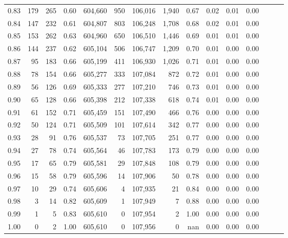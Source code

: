 \begin{tabular}{rrrrrrrrrrrrrrr}
0.83 &     179 &    265 &  0.60 &  604,660 &      950 &  106,016 &    1,940 &  0.67 &  0.02 &  0.01 &      0.00 \\
0.84 &     147 &    232 &  0.61 &  604,807 &      803 &  106,248 &    1,708 &  0.68 &  0.02 &  0.01 &      0.00 \\
0.85 &     153 &    262 &  0.63 &  604,960 &      650 &  106,510 &    1,446 &  0.69 &  0.01 &  0.01 &      0.00 \\
0.86 &     144 &    237 &  0.62 &  605,104 &      506 &  106,747 &    1,209 &  0.70 &  0.01 &  0.00 &      0.00 \\
0.87 &      95 &    183 &  0.66 &  605,199 &      411 &  106,930 &    1,026 &  0.71 &  0.01 &  0.00 &      0.00 \\
0.88 &      78 &    154 &  0.66 &  605,277 &      333 &  107,084 &      872 &  0.72 &  0.01 &  0.00 &      0.00 \\
0.89 &      56 &    126 &  0.69 &  605,333 &      277 &  107,210 &      746 &  0.73 &  0.01 &  0.00 &      0.00 \\
0.90 &      65 &    128 &  0.66 &  605,398 &      212 &  107,338 &      618 &  0.74 &  0.01 &  0.00 &      0.00 \\
0.91 &      61 &    152 &  0.71 &  605,459 &      151 &  107,490 &      466 &  0.76 &  0.00 &  0.00 &      0.00 \\
0.92 &      50 &    124 &  0.71 &  605,509 &      101 &  107,614 &      342 &  0.77 &  0.00 &  0.00 &      0.00 \\
0.93 &      28 &     91 &  0.76 &  605,537 &       73 &  107,705 &      251 &  0.77 &  0.00 &  0.00 &      0.00 \\
0.94 &      27 &     78 &  0.74 &  605,564 &       46 &  107,783 &      173 &  0.79 &  0.00 &  0.00 &      0.00 \\
0.95 &      17 &     65 &  0.79 &  605,581 &       29 &  107,848 &      108 &  0.79 &  0.00 &  0.00 &      0.00 \\
0.96 &      15 &     58 &  0.79 &  605,596 &       14 &  107,906 &       50 &  0.78 &  0.00 &  0.00 &      0.00 \\
0.97 &      10 &     29 &  0.74 &  605,606 &        4 &  107,935 &       21 &  0.84 &  0.00 &  0.00 &      0.00 \\
0.98 &       3 &     14 &  0.82 &  605,609 &        1 &  107,949 &        7 &  0.88 &  0.00 &  0.00 &      0.00 \\
0.99 &       1 &      5 &  0.83 &  605,610 &        0 &  107,954 &        2 &  1.00 &  0.00 &  0.00 &      0.00 \\
1.00 &       0 &      2 &  1.00 &  605,610 &        0 &  107,956 &        0 &   nan &  0.00 &  0.00 &      0.00 \\
\bottomrule
\end{tabular}
